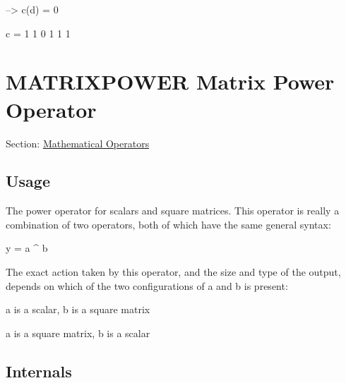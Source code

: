 \begin{DoxyVerbInclude}
--> c(d) = 0

c = 
 1 1 0 1 1 1 
\end{DoxyVerbInclude}
 \hypertarget{operators_matrixpower}{}\section{M\-A\-T\-R\-I\-X\-P\-O\-W\-E\-R Matrix Power Operator}\label{operators_matrixpower}
Section\-: \hyperlink{sec_operators}{Mathematical Operators} \hypertarget{vtkwidgets_vtkxyplotwidget_Usage}{}\subsection{Usage}\label{vtkwidgets_vtkxyplotwidget_Usage}
The power operator for scalars and square matrices. This operator is really a combination of two operators, both of which have the same general syntax\-: \begin{DoxyVerb}  y = a ^ b
\end{DoxyVerb}
 The exact action taken by this operator, and the size and type of the output, depends on which of the two configurations of {\ttfamily a} and {\ttfamily b} is present\-: 
\begin{DoxyEnumerate}
\item {\ttfamily a} is a scalar, {\ttfamily b} is a square matrix  
\item {\ttfamily a} is a square matrix, {\ttfamily b} is a scalar  
\end{DoxyEnumerate}\hypertarget{transforms_svd_Function}{}\subsection{Internals}\label{transforms_svd_Function}
